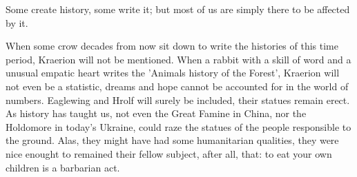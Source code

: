 Some create history, some write it; but most of us are simply there to be affected by it.

When some crow decades from now sit down to write the histories of this time period, Kraerion will not be mentioned. When a rabbit with a skill of word and a unusual empatic heart writes the 'Animals history of the Forest', Kraerion will not even be a statistic, dreams and hope cannot be accounted for in the world of numbers. Eaglewing and Hrolf will surely be included, their statues remain erect. As history has taught us, not even the Great Famine in China, nor the Holdomore in today's Ukraine, could raze the statues of the people responsible to the ground. Alas, they might have had some humanitarian qualities, they were nice enought to remained their fellow subject, after all, that: to eat your own children is a barbarian act.






